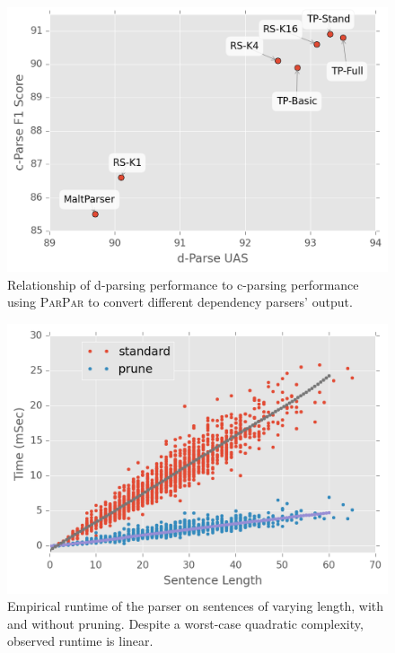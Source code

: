 \documentclass[11pt,letterpaper]{article}
\newcommand{\ParseName}{\textsc{ParPar}\xspace}
\begin{document}




\begin{figure}
  \centering
  \includegraphics[scale=0.5]{../notebooks/parsers}
\caption{\label{fig:corr} Relationship of d-parsing performance to
  c-parsing performance using \ParseName to convert different
  dependency parsers' output.}
\end{figure}


\begin{figure}
  \centering
  \includegraphics[scale=0.5]{../notebooks/comp}
  \caption{Empirical runtime of the parser on sentences of varying length, with and without pruning. 
  Despite a worst-case quadratic complexity, observed runtime is
  linear.
\label{fig:speed}}
\end{figure}
\end{document}
